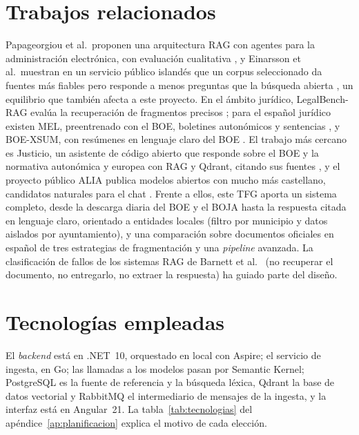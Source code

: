 \section{Trabajos relacionados}
\label{sec:relacionados}

Papageorgiou et al.\ proponen una arquitectura RAG con agentes para la administración electrónica, con evaluación cualitativa \cite{papageorgiou2024}, y Einarsson et al.\ muestran en un servicio público islandés que un corpus seleccionado da fuentes más fiables pero responde a menos preguntas que la búsqueda abierta \cite{einarsson2026}, un equilibrio que también afecta a este proyecto. En el ámbito jurídico, LegalBench-RAG evalúa la recuperación de fragmentos precisos \cite{pipitone2024legalbench}; para el español jurídico existen MEL, preentrenado con el BOE, boletines autonómicos y sentencias \cite{betancur2025mel}, y BOE-XSUM, con resúmenes en lenguaje claro del BOE \cite{fernandez2025boexsum}. El trabajo más cercano es Justicio, un asistente de código abierto que responde sobre el BOE y la normativa autonómica y europea con RAG y Qdrant, citando sus fuentes \cite{justicio}, y el proyecto público ALIA publica modelos abiertos con mucho más castellano, candidatos naturales para el chat \cite{alia}. Frente a ellos, este TFG aporta un sistema completo, desde la descarga diaria del BOE y el BOJA hasta la respuesta citada en lenguaje claro, orientado a entidades locales (filtro por municipio y datos aislados por ayuntamiento), y una comparación sobre documentos oficiales en español de tres estrategias de fragmentación y una \emph{pipeline} avanzada. La clasificación de fallos de los sistemas RAG de Barnett et al.\ \cite{barnett2024seven} (no recuperar el documento, no entregarlo, no extraer la respuesta) ha guiado parte del diseño.

\section{Tecnologías empleadas}
\label{sec:tecnologias}

El \emph{backend} está en .NET~10, orquestado en local con Aspire; el servicio de ingesta, en Go; las llamadas a los modelos pasan por Semantic Kernel; PostgreSQL es la fuente de referencia y la búsqueda léxica, Qdrant la base de datos vectorial y RabbitMQ el intermediario de mensajes de la ingesta, y la interfaz está en Angular~21. La tabla~\ref{tab:tecnologias} del apéndice~\ref{ap:planificacion} explica el motivo de cada elección.
